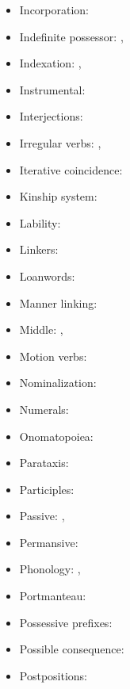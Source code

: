 \documentclass[oldfontcommands,oneside,a4paper,11pt]{article}
\begin{document}
\begin{itemize}
\begin{itemize}
\end{itemize}
\item Incorporation: \citet{jacques12incorp}
\item Indefinite possessor: \citet[1212]{jacques12incorp}, \citet[4]{jacques14antipassive}
\item Indexation: \citet{jacques10inverse}, \citet[85]{jacques12agreement}
\item Instrumental: \citet{jacques15comparative}
\item Interjections: \citet[283]{japhug14ideophones}
\item Irregular verbs: \citet[91]{jacques12agreement}, \citet[1215]{jacques12incorp}
\item Iterative coincidence: \citet[296]{jacques14linking}
\item Kinship system: \citet{jacques11kinship}
\item Lability: \citet[216-9]{jacques12demotion}
\item Linkers:  \citet[276-7]{jacques14linking}
\item Loanwords: \citet[83-199]{jacques04these}
\item Manner linking:  \citet[320-5]{jacques14linking}
\item Middle:  \citet{jacques12demotion}, \citet{jacques15spontaneous}
\item Motion verbs: \citet[201-6]{jacques13harmonization}
\item Nominalization: \citet[5-7]{jacques14antipassive}
\item Numerals: \citet[4]{jacques14antipassive}
\item Onomatopoiea:   \citet[282]{japhug14ideophones}
\item Parataxis:  \citet[312;315]{jacques14linking}
\item Participles: \citet[5-6]{jacques14antipassive}
\item Passive: \citet{jacques07passif}, \citet[208-13]{jacques12demotion}
\item Permansive: \citet{jacques15spontaneous}
\item Phonology: \citet[12-82]{jacques04these}, \citet{jacques08}
\item Portmanteau: \citet[136-7]{jacques10inverse}
\item Possessive prefixes: \citet[4]{jacques14antipassive}
\item Possible consequence:  \citet[308-311]{jacques14linking}
\item Postpositions:  \citet[272-4]{jacques14linking}

\end{itemize}
\end{document}
